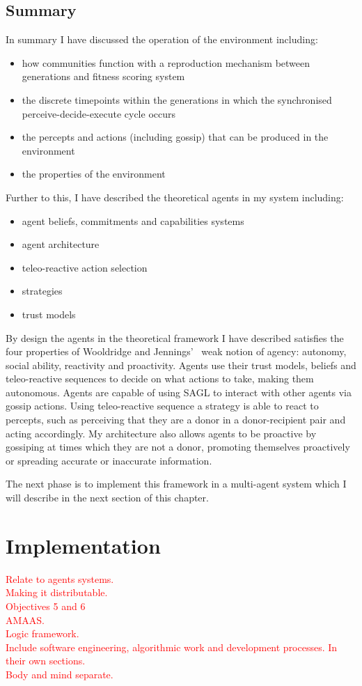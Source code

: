 \documentclass[]{final_report}
\begin{document}
\subsection{Summary}
\noindent
In summary I have discussed the operation of the environment including:
\begin{itemize}
	\item how communities function with a reproduction mechanism between generations and fitness scoring system
	\item the discrete timepoints within the generations in which the synchronised perceive-decide-execute cycle occurs
	\item the percepts and actions (including gossip) that can be produced in the environment
	\item the properties of the environment
\end{itemize} 
Further to this, I have described the theoretical agents in my system including:
\begin{itemize}
	\item agent beliefs, commitments and capabilities systems
	\item agent architecture
	\item teleo-reactive action selection
	\item strategies
	\item trust models
\end{itemize}
\par
By design the agents in the theoretical framework I have described satisfies the four properties of Wooldridge and Jennings'~\cite{wooldridge_jennings_1995} weak notion of agency: autonomy, social ability, reactivity and proactivity. Agents use their trust models, beliefs and teleo-reactive sequences to decide on what actions to take, making them autonomous. Agents are capable of using SAGL to interact with other agents via gossip actions. Using teleo-reactive sequence a strategy is able to react to percepts, such as perceiving that they are a donor in a donor-recipient pair and acting accordingly. My architecture also allows agents to be proactive by gossiping at times which they are not a donor, promoting themselves proactively or spreading accurate or inaccurate information.\par
The next phase is to implement this framework in a multi-agent system which I will describe in the next section of this chapter.

\section{Implementation}
\textcolor{red}{Relate to agents systems.\\
Making it distributable.\\
Objectives 5 and 6\\
AMAAS.\\
Logic framework.\\
Include software engineering, algorithmic work and development processes. In their own sections.\\
Body and mind separate.}\par
\end{document}
